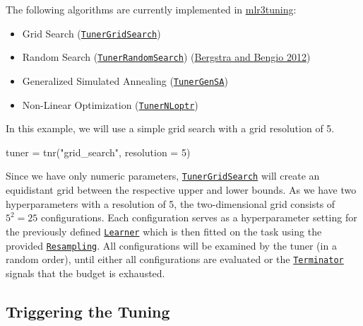 \documentclass[
]{scrbook}
\newenvironment{Shaded}{\begin{snugshade}}{\end{snugshade}}
\newcommand{\AttributeTok}[1]{\textcolor[rgb]{0.77,0.63,0.00}{#1}}
\newcommand{\DecValTok}[1]{\textcolor[rgb]{0.00,0.00,0.81}{#1}}
\newcommand{\FunctionTok}[1]{\textcolor[rgb]{0.00,0.00,0.00}{#1}}
\newcommand{\NormalTok}[1]{#1}
\newcommand{\OtherTok}[1]{\textcolor[rgb]{0.56,0.35,0.01}{#1}}
\newcommand{\StringTok}[1]{\textcolor[rgb]{0.31,0.60,0.02}{#1}}
\providecommand{\tightlist}{%
  \setlength{\itemsep}{0pt}\setlength{\parskip}{0pt}}
\renewenvironment{Shaded} {\begin{snugshade}\small} {\end{snugshade}}
\begin{document}
The following algorithms are currently implemented in \href{https://mlr3tuning.mlr-org.com}{mlr3tuning}:

\begin{itemize}
\tightlist
\item
  Grid Search (\href{https://mlr3tuning.mlr-org.com/reference/mlr_tuners_grid_search.html}{\texttt{TunerGridSearch}})
\item
  Random Search (\href{https://mlr3tuning.mlr-org.com/reference/mlr_tuners_random_search.html}{\texttt{TunerRandomSearch}}) (\protect\hyperlink{ref-bergstra2012}{Bergstra and Bengio 2012})
\item
  Generalized Simulated Annealing (\href{https://mlr3tuning.mlr-org.com/reference/mlr_tuners_gensa.html}{\texttt{TunerGenSA}})
\item
  Non-Linear Optimization (\href{https://mlr3tuning.mlr-org.com/reference/mlr_tuners_nloptr.html}{\texttt{TunerNLoptr}})
\end{itemize}

In this example, we will use a simple grid search with a grid resolution of 5.

\begin{Shaded}
\begin{Highlighting}[]
\NormalTok{tuner }\OtherTok{=} \FunctionTok{tnr}\NormalTok{(}\StringTok{"grid\_search"}\NormalTok{, }\AttributeTok{resolution =} \DecValTok{5}\NormalTok{)}
\end{Highlighting}
\end{Shaded}

Since we have only numeric parameters, \href{https://mlr3tuning.mlr-org.com/reference/mlr_tuners_grid_search.html}{\texttt{TunerGridSearch}} will create an equidistant grid between the respective upper and lower bounds.
As we have two hyperparameters with a resolution of 5, the two-dimensional grid consists of \(5^2 = 25\) configurations.
Each configuration serves as a hyperparameter setting for the previously defined \href{https://mlr3.mlr-org.com/reference/Learner.html}{\texttt{Learner}} which is then fitted on the task using the provided \href{https://mlr3.mlr-org.com/reference/Resampling.html}{\texttt{Resampling}}.
All configurations will be examined by the tuner (in a random order), until either all configurations are evaluated or the \href{https://bbotk.mlr-org.com/reference/Terminator.html}{\texttt{Terminator}} signals that the budget is exhausted.

\hypertarget{tuning-triggering}{%
\subsection{Triggering the Tuning}\label{tuning-triggering}}
\end{document}

